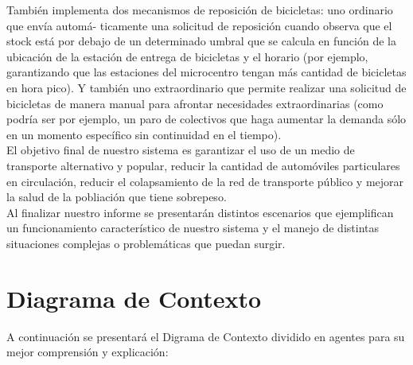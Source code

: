 \documentclass[a4paper, 11pt, spanish]{article}
\begin{document}
También implementa dos mecanismos de reposición de bicicletas: uno ordinario que envía automá- ticamente una solicitud de reposición cuando observa que el stock está por debajo de un determinado umbral que se calcula en función de la ubicación de la estación de entrega de bicicletas y el horario (por ejemplo, garantizando que las estaciones del microcentro tengan más cantidad de bicicletas en hora pico). Y también uno extraordinario que permite realizar una solicitud de bicicletas de manera manual para afrontar necesidades extraordinarias (como podría ser por ejemplo, un paro de colectivos que haga aumentar la demanda sólo en un momento específico sin continuidad en el tiempo).\\




El objetivo final de nuestro sistema es garantizar el uso de un medio de transporte alternativo y popular, reducir la cantidad de automóviles particulares en circulación, reducir el colapsamiento de la red de transporte público y mejorar la salud de la pobliación que tiene sobrepeso.\\


Al finalizar nuestro informe se presentarán distintos escenarios que ejemplifican un funcionamiento característico de nuestro sistema y el manejo de distintas situaciones complejas o problemáticas que puedan surgir.

\newpage
\section{Diagrama de Contexto}
A continuación se presentará el Digrama de Contexto dividido en agentes para su mejor comprensión y explicación:\\
\end{document}

